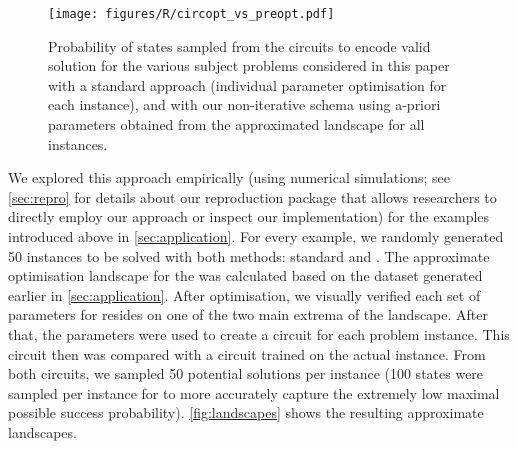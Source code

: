 \begin{figure}[htbp]
    \texttt{[image: figures/R/circopt\_vs\_preopt.pdf]}\vspace*{-1em}
    \caption{Probability of states sampled from the \QAOA circuits to encode valid solution for the various subject problems considered in this paper with a standard \QAOA approach (individual parameter optimisation for each instance), and with our non-iterative schema using a-priori
    parameters obtained from the approximated landscape for all instances.}\label{fig:circopt_vs_preopt}
\end{figure}

We explored this approach empirically (using numerical simulations; see \cref{sec:repro} for details about our reproduction package that allows researchers to directly employ our approach or inspect our implementation) for the examples introduced above in \cref{sec:application}. For every example, we randomly generated 50 instances to be solved with both \QAOA methods: standard \QAOA and \ourQAOA. The approximate optimisation landscape for the \ourQAOA was calculated based on the dataset generated earlier in \cref{sec:application}. After  optimisation, we visually verified each set of parameters for \ourQAOA resides on one of the two main extrema of the landscape. After that, the parameters were used to create a \QAOA circuit for each problem instance. This circuit then was compared with a \QAOA circuit trained on the actual instance. From both circuits, we sampled 50 potential solutions per instance (100 states were sampled per instance for \qrfactoring to more accurately capture the extremely low maximal possible success probability). \cref{fig:landscapes} shows the resulting approximate landscapes. 


